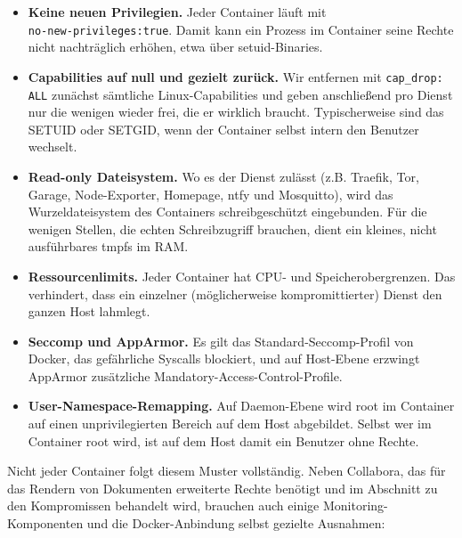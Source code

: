 \begin{itemize}
  \item \textbf{Keine neuen Privilegien.} Jeder Container läuft mit\\
    \texttt{no-new-privileges:true}. Damit kann ein Prozess im Container seine
    Rechte nicht nachträglich erhöhen, etwa über setuid-Binaries.
  \item \textbf{Capabilities auf null und gezielt zurück.} Wir entfernen mit
    \texttt{cap\_drop: ALL} zunächst sämtliche Linux-Capabilities und geben
    anschließend pro Dienst nur die wenigen wieder frei, die er wirklich
    braucht. Typischerweise sind das SETUID oder SETGID, wenn der Container selbst intern den Benutzer wechselt. 
  \item \textbf{Read-only Dateisystem.} Wo es der Dienst zulässt (z.B. Traefik,
    Tor, Garage, Node-Exporter, Homepage, ntfy und Mosquitto), wird das
    Wurzeldateisystem des Containers schreibgeschützt eingebunden. Für die
    wenigen Stellen, die echten Schreibzugriff brauchen, dient ein kleines,
    nicht ausführbares tmpfs im \ac{RAM}.
  \item \textbf{Ressourcenlimits.} Jeder Container hat \ac{CPU}- und
    Speicherobergrenzen. Das verhindert, dass ein einzelner (möglicherweise
    kompromittierter) Dienst den ganzen Host lahmlegt.
  \item \textbf{Seccomp und AppArmor.} Es gilt das Standard-Seccomp-Profil von
    Docker, das gefährliche Syscalls blockiert, und auf Host-Ebene erzwingt
    AppArmor zusätzliche Mandatory-Access-Control-Profile.
  \item \textbf{User-Namespace-Remapping.} Auf Daemon-Ebene wird root im
    Container auf einen unprivilegierten Bereich auf dem Host abgebildet. Selbst
    wer im Container root wird, ist auf dem Host damit ein Benutzer ohne Rechte.
\end{itemize}

Nicht jeder Container folgt diesem Muster vollständig. Neben Collabora, das für
das Rendern von Dokumenten erweiterte Rechte benötigt und im Abschnitt zu den
Kompromissen behandelt wird, brauchen auch einige Monitoring-Komponenten und
die Docker-Anbindung selbst gezielte Ausnahmen:

